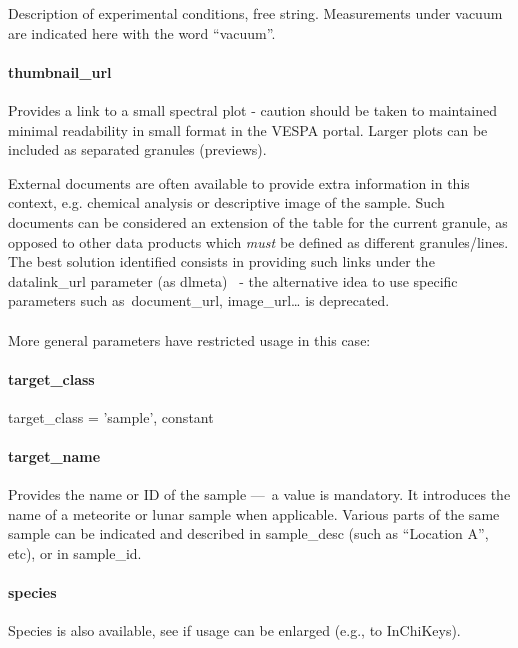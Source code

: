 \documentclass[11pt,a4paper]{ivoa}
\begin{document}
Description of experimental conditions, free string. Measurements under vacuum are indicated here with the word ``vacuum''.

\paragraph{thumbnail\_url}

Provides a link to a small spectral plot - caution should be taken to maintained minimal readability in small format in the VESPA portal. Larger plots can be included as separated granules (previews).

External documents are often available to provide extra information in this context, e.g. chemical analysis or descriptive image of the sample. Such documents can be considered an extension of the table for the current granule, as opposed to other data products which \emph{must} be defined as different granules/lines. The best solution identified consists in providing such links under the datalink\_url parameter (as dlmeta)  - the alternative idea to use specific parameters such as document\_url, image\_url… is deprecated.\\\\

More general parameters have restricted usage in this case:

\paragraph{target\_class\textbf{ }}

target\_class = 'sample', constant

\paragraph{target\_name}

Provides the name or ID of the sample — a value is mandatory. It introduces the name of a meteorite or lunar sample when applicable. Various parts of the same sample can be indicated and described in sample\_desc (such as ``Location A'', etc), or in sample\_id.

\paragraph{species}

Species is also available, see if usage can be enlarged (e.g., to InChiKeys).

\\
\end{document}

